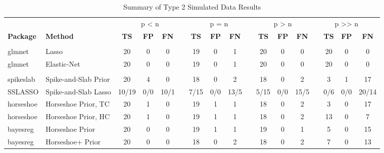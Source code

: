 \documentclass[
  11pt,
]{article}
\begin{document}
\begin{landscape}
    
\begin{table}[H]

\caption{\label{tab:Results T2}Summary of Type 2 Simulated Data Results}
\centering
\fontsize{10}{12}\selectfont
\begin{tabular}[t]{>{}l|>{}l|>{}c|>{}c|>{}c|>{}c|>{}c|>{}c|>{}c|>{}c|>{}c|>{}c|>{}c|>{}c|>{}c|>{}c|>{}c|}
\toprule
\multicolumn{2}{c}{ } & \multicolumn{4}{c}{p < n} & \multicolumn{4}{c}{p = n} & \multicolumn{3}{c}{p > n} & \multicolumn{4}{c}{p >> n} \\
\cmidrule(l{3pt}r{3pt}){3-6} \cmidrule(l{3pt}r{3pt}){7-10} \cmidrule(l{3pt}r{3pt}){11-13} \cmidrule(l{3pt}r{3pt}){14-17}
\textbf{Package} & \textbf{Method} & \textbf{TS} & \textbf{FP} & \textbf{FN} &  & \textbf{TS} & \textbf{FP} & \textbf{FN} &  & \textbf{TS} & \textbf{FP} & \textbf{FN} &  & \textbf{TS} & \textbf{FP} & \textbf{FN}\\
\midrule
\addlinespace[0.3em]
\multicolumn{17}{l}{\textit{Frequentist Methods}}\\
\hspace{1em}glmnet & Lasso & 20 & 0 & 0 &  & 19 & 0 & 1 &  & 20 & 0 & 0 &  & 20 & 0 & 0\\
\hspace{1em}glmnet & Elastic-Net & 20 & 0 & 0 &  & 19 & 0 & 1 &  & 20 & 0 & 0 &  & 20 & 0 & 0\\
\addlinespace[0.3em]
\multicolumn{17}{l}{\textit{Bayesian Methods}}\\
\hspace{1em}spikeslab & Spike-and-Slab Prior & 20 & 4 & 0 &  & 18 & 0 & 2 &  & 18 & 0 & 2 &  & 3 & 1 & 17\\
\hspace{1em}SSLASSO & Spike-and-Slab Lasso & 10/19 & 0/0 & 10/1 &  & 7/15 & 0/0 & 13/5 &  & 5/15 & 0/0 & 15/5 &  & 0/6 & 0/0 & 20/14\\
\hspace{1em}horseshoe & Horseshoe Prior, TC & 20 & 1 & 0 &  & 19 & 1 & 1 &  & 18 & 0 & 2 &  & 3 & 0 & 17\\
\hspace{1em}horseshoe & Horseshoe Prior, HC & 20 & 1 & 0 &  & 19 & 1 & 1 &  & 18 & 0 & 2 &  & 13 & 0 & 7\\
\hspace{1em}bayesreg & Horseshoe Prior & 20 & 0 & 0 &  & 19 & 1 & 1 &  & 19 & 0 & 1 &  & 5 & 0 & 15\\
\hspace{1em}bayesreg & Horseshoe+ Prior & 20 & 0 & 0 &  & 18 & 0 & 2 &  & 18 & 0 & 2 &  & 7 & 0 & 13\\

\end{tabular}
\end{table}
\end{landscape}
\end{document}
